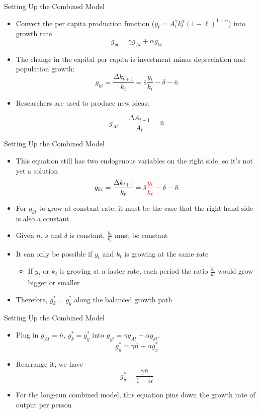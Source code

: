 \documentclass[aspectratio=1610]{beamer}
\begin{document}
\begin{frame}[wide]{Setting Up the Combined Model}
	\begin{itemize}
		\item Convert the per capita production function ($y_t = A^\gamma_t k^\alpha_t (1-\ell)^{1-\alpha}$) into growth rate
		\[g_{yt} = \gamma g_{At} + \alpha g_{kt} \]
		\vspace{1mm}
		\item The change in the capital per capita is investment minus depreciation and population growth:
		\[g_{kt} = \frac{\Delta k_{t+1}}{k_t} = \bar{s} \frac{y_t}{k_t} - \delta - \bar{n}\]
		\vspace{1mm}
		\item Researchers are used to produce new ideas:
		
		\[g_{At} = \frac{\Delta A_{t+1}}{A_t} = \bar{n}\]
	\end{itemize}
\end{frame}

\begin{frame}[wide]{Setting Up the Combined Model}
	\begin{itemize}
		\item This equation still has two endogenous variables on the right side, so it’s not yet a solution
		\[g_{kt} = \frac{\Delta k_{t+1}}{k_t} = \bar{s} \textcolor{red}{\frac{y_t}{k_t} }- \delta -\bar{n}\]
		\item For $g_{kt}$ to grow at constant rate, it must be the case that the right hand side is also a constant
		\item Given $\bar{n}$, $\bar{s}$ and $\delta$ is constant, $\frac{y_t}{k_t}$ must be constant
		\item It can only be possible if $y_t$ and $k_t$ is growing at the same rate
		\begin{itemize}
			\item If $y_t$ or $k_t$ is growing at a faster rate, each period the ratio $\frac{y_t}{k_t}$ would grow bigger or smaller
		\end{itemize}
		\item Therefore, $g_k^* = g_y^*$ along the balanced growth path
	\end{itemize}
\end{frame}

\begin{frame}[wide]{Setting Up the Combined Model}
	\begin{itemize}
		\item Plug in $g_{At}=\bar{n}$, $g_k^* = g_y^*$ into $g_{yt} = \gamma g_{At} + \alpha g_{kt} $,
		\[g_{y}^* = \gamma\bar{n} + \alpha g_{y}^* \]
		\vspace{2mm}
		\item Rearrange it, we have 
		\[g_{y}^* = \frac{\gamma\bar{n}}{1-\alpha} \]
		\vspace{2mm}
		\item For the long-run combined model, this equation pins down the growth rate of output per person
	\end{itemize}
\end{frame}
\end{document}

